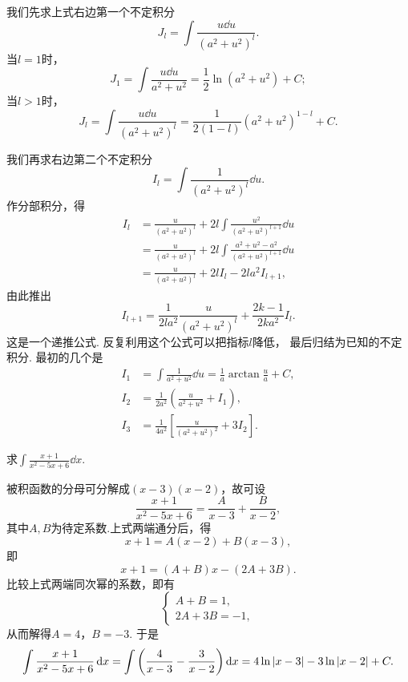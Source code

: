 我们先求上式右边第一个不定积分\[
	J_l = \int \frac{u \dd{u}}{(a^2+u^2)^l}.
\]
当\(l=1\)时，\[
	J_1
	= \int \frac{u \dd{u}}{a^2+u^2}
	= \frac{1}{2} \ln(a^2+u^2) + C;
\]
当\(l>1\)时，\[
	J_l
	= \int \frac{u \dd{u}}{(a^2+u^2)^l}
	= \frac{1}{2(1-l)} (a^2+u^2)^{1-l} + C.
\]

我们再求右边第二个不定积分\[
	I_l = \int \frac{1}{(a^2+u^2)^l} \dd{u}.
\]
作分部积分，得\begin{align*}
	I_l &= \frac{u}{(a^2+u^2)^l} + 2l \int \frac{u^2}{(a^2+u^2)^{l+1}} \dd{u} \\
	&= \frac{u}{(a^2+u^2)^l} + 2l \int \frac{a^2+u^2-a^2}{(a^2+u^2)^{l+1}} \dd{u} \\
	&= \frac{u}{(a^2+u^2)^l} + 2l I_l - 2la^2 I_{l+1},
\end{align*}
由此推出\[
	I_{l+1} = \frac{1}{2la^2} \frac{u}{(a^2+u^2)^l} + \frac{2k-1}{2ka^2} I_l.
\]
这是一个递推公式.
反复利用这个公式可以把指标\(l\)降低，
最后归结为已知的不定积分.
最初的几个是\begin{align*}
	I_1 &= \int \frac{1}{a^2+u^2} \dd{u} = \frac{1}{a} \arctan\frac{u}{a} + C, \\
	I_2 &= \frac{1}{2a^2} \left( \frac{u}{a^2+u^2} + I_1 \right), \\
	I_3 &= \frac{1}{4a^2} \left[ \frac{u}{(a^2+u^2)^2} + 3 I_2 \right].
\end{align*}

\begin{example}
求\(\int \frac{x+1}{x^2-5x+6} \dd{x}\).
\begin{solution}
被积函数的分母可分解成\((x-3)(x-2)\)，故可设\[
	\frac{x+1}{x^2-5x+6}
	= \frac{A}{x-3} + \frac{B}{x-2},
\]
其中\(A,B\)为待定系数.上式两端通分后，得\[
	x+1 = A(x-2)+B(x-3),
\]
即\[
	x+1 = (A+B)x -(2A+3B).
\]
比较上式两端同次幂的系数，即有\[
	\left\{ \begin{array}{l}
		A+B = 1, \\
		2A+3B = -1,
	\end{array} \right.
\]
从而解得\(A=4\)，\(B=-3\).
于是\[
	\int \frac{x+1}{x^2-5x+6} \dd{x}
	= \int \left(\frac{4}{x-3} - \frac{3}{x-2}\right) \dd{x}
	= 4\ln\abs{x-3} - 3\ln\abs{x-2} + C.
\]
\end{solution}
\end{example}

